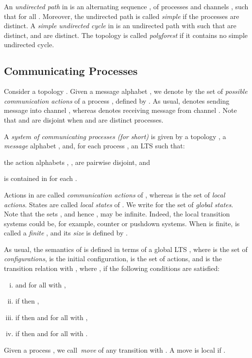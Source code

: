 \documentclass{LMCS}
\newenvironment{definition}{\begin{defi}}{\end{defi}}
\begin{document}
An \emph{undirected path} in  is an alternating sequence
, of processes  and
channels ,
such that  for all .
Moreover, the undirected path is called \emph{simple} if the processes
 are distinct.
A \emph{simple undirected cycle} in  is an undirected path
 with 
such that  are distinct, and
 are distinct. 
The topology  is called \emph{polyforest} if it contains no
simple undirected cycle.


\subsection{Communicating  Processes}

Consider a topology .
Given a message alphabet , we denote by  the set
of \emph{possible communication actions} of a process ,
defined by .  As usual, 
denotes sending message  into channel , whereas 
denotes receiving message  from channel .
Note that  and  are disjoint when
 and  are distinct processes.



\begin{definition}
  A \emph{system of communicating processes (\qcp for short)}
   is given by a topology
  , a \emph{message} alphabet , and, for each process
  , an LTS 
  such that:
  \begin{iteMize}{}
  \item the action alphabets , , are pairwise disjoint, and
  \item  is contained in
     for each .
  \end{iteMize}
\end{definition}



\noindent Actions in  are called \emph{communication actions} of
, whereas  is the set of
\emph{local actions}. States  are called
\emph{local states} of . We write  for the
set of \emph{global states}. Note that the sets , and
hence , may be infinite.  Indeed, the local transition
systems  could be, for example, counter
or pushdown systems.  When 
is finite,  is called a \emph{finite} \qcp,
and its \emph{size} is defined by
.

\smallskip

As usual, the semantics of \qcp is defined in terms of a global LTS
, where  is the set of \emph{configurations},  is the initial configuration,
   is the set of actions, and
   is
  the transition relation with , where , if 
  the following conditions are satisfied:
  \begin{enumerate}[(i)]
  \item  and  for all  with ,
  \item if  then ,
  \item if  then  and  for all  with ,
  \item if  then  and  for all  with .
  \end{enumerate}
Given a process , we call~\emph{move} of  any transition
 with . A move is local if .
\end{document}
